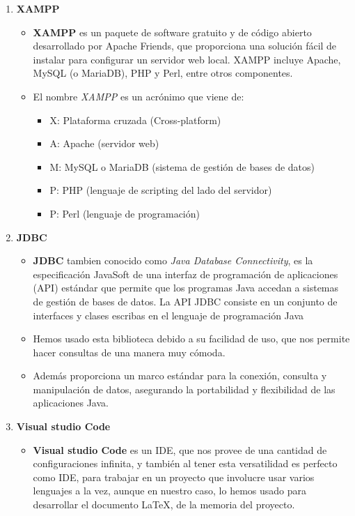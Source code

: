 \documentclass[a4paper]{article}
\begin{document}
\begin{enumerate}
    \item \textbf{XAMPP}
          \begin{itemize}
              \item \textbf{XAMPP} es un paquete de software gratuito y de código abierto desarrollado por Apache Friends, que proporciona una solución fácil de instalar para configurar un servidor web local. XAMPP incluye Apache, MySQL (o MariaDB), PHP y Perl, entre otros componentes.
              \item El nombre \textit{XAMPP} es un acrónimo que viene de: 
              \begin{itemize}
                \item X: Plataforma cruzada (Cross-platform)
                \item A: Apache (servidor web)
                \item M: MySQL o MariaDB (sistema de gestión de bases de datos)
                \item P: PHP (lenguaje de scripting del lado del servidor)
                \item P: Perl (lenguaje de programación)
              \end{itemize}
          \end{itemize}
    \item \textbf{JDBC}
          \begin{itemize}
              \item \textbf{JDBC} tambien conocido como \textit{Java Database Connectivity}, es la especificación JavaSoft de una interfaz de programación de aplicaciones (API) estándar que permite que los programas Java accedan a sistemas de gestión de bases de datos. La API JDBC consiste en un conjunto de interfaces y clases escribas en el lenguaje de programación Java
              \item Hemos usado esta biblioteca debido a su facilidad de uso, que nos permite hacer consultas de una manera muy cómoda.
              \item Además proporciona un marco estándar para la conexión, consulta y manipulación de datos, asegurando la portabilidad y flexibilidad de las aplicaciones Java.
          \end{itemize}
    \item \textbf{Visual studio Code}
          \begin{itemize}
              \item \textbf{Visual studio Code} es un IDE, que nos provee de una cantidad de configuraciones infinita, y también al tener esta versatilidad es perfecto como IDE, para trabajar en un proyecto que involucre usar varios lenguajes a la vez, aunque en nuestro caso, lo hemos usado para desarrollar el documento \LaTeX, de la memoria del proyecto.

\end{itemize}
\end{enumerate}
\end{document}
